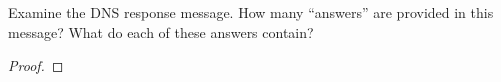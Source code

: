 \documentclass[../../main.tex]{subfiles}
\begin{document}
\begin{wts}
Examine the DNS response message. How many “answers” are provided in this message? What do each of these answers contain?
\end{wts}
\begin{proof}

\end{proof}
\end{document}
